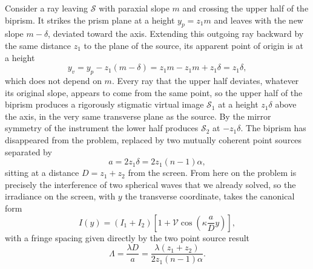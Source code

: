         Consider a ray leaving $\mathcal{S}$ with paraxial slope $m$ and crossing the upper half of the biprism. It strikes the prism plane at a height $y_p = z_1 m$ and leaves with the new slope $m-\delta$, deviated toward the axis. Extending this outgoing ray backward by the same distance $z_1$ to the plane of the source, its apparent point of origin is at a height
        \begin{equation}
            y_v = y_p - z_1(m-\delta) = z_1 m - z_1 m + z_1 \delta = z_1 \delta,
        \end{equation}
        which does not depend on $m$. Every ray that the upper half deviates, whatever its original slope, appears to come from the same point, so the upper half of the biprism produces a rigorously stigmatic virtual image $\mathcal{S}_1$ at a height $z_1\delta$ above the axis, in the very same transverse plane as the source. By the mirror symmetry of the instrument the lower half produces $\mathcal{S}_2$ at $-z_1\delta$. The biprism has disappeared from the problem, replaced by two mutually coherent point sources separated by
        \begin{equation}\label{eq:BiprismSeparation}
            a = 2z_1\delta = 2z_1(n-1)\alpha,
        \end{equation}
        sitting at a distance $D = z_1+z_2$ from the screen. From here on the problem is precisely the interference of two spherical waves that we already solved, so the irradiance on the screen, with $y$ the transverse coordinate, takes the canonical form
        \begin{equation}\label{eq:BiprismIrradiance}
            I(y) = (I_1+I_2)\left[1 + \mathcal{V}\cos\left(\kappa\frac{a}{D}y\right)\right],
        \end{equation}
        with a fringe spacing given directly by the two point source result
        \begin{equation}\label{eq:BiprismLambda}
            \Lambda = \frac{\lambda D}{a} = \frac{\lambda(z_1+z_2)}{2z_1(n-1)\alpha}.
        \end{equation}

